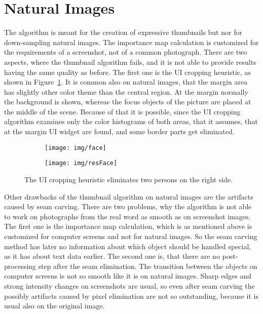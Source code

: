 \documentclass[draft,final]{vutinfth} %
\begin{document}
	\section{Natural Images}
	The algorithm is meant for the creation of expressive thumbnails but nor for down-sampling natural images.
	The importance map calculation is customized for the requirements of a screenshot, not of a common photograph.
	There are two aspects, where the thumbnail algorithm fails, and it is not able to provide results having the same quality as before.
	The first one is the UI cropping heuristic, as shown in Figure~\ref{fig:nat:face}.
	It is common also on natural images, that the margin area has slightly other color theme than the central region.
	At the margin normally the background is shown, whereas the focus objects of the picture are placed at the middle of the scene.
	Because of that it is possible, since the UI cropping algorithm examines only the color histograms of both areas, that it assumes, that at the margin UI widget are found, and some border parts get eliminated.
	\begin{figure}[H]
		\centering
		\begin{subfigure}[b]{0.45\columnwidth}
			\centering
			\texttt{[image: img/face]}
		\end{subfigure}
		\begin{subfigure}[b]{0.45\columnwidth}
			\centering
			\texttt{[image: img/resFace]}
		\end{subfigure}
		\caption{The UI cropping heuristic eliminates two persons on the right side.}
		\label{fig:nat:face}
	\end{figure}  
	Other drawbacks of the thumbnail algorithm on natural images are the artifacts caused by seam carving.
	There are two problems, why the algorithm is not able to work on photographs from the real word as smooth as on screenshot images.
	The first one is the importance map calculation, which is as mentioned above is customized for computer screens and not for natural images.
	So the seam carving method has later no information about which object should be handled special, as it has about text data earlier.
	The second one is, that there are no post-processing step after the seam elimination.	
	The transition between the objects on computer screens is not so smooth like it is on natural images.
	Sharp edges and strong intensity changes on screenshots are usual, so even after seam carving the possibly artifacts caused by pixel elimination are not so outstanding, because it is usual also on the original image.
\end{document}
